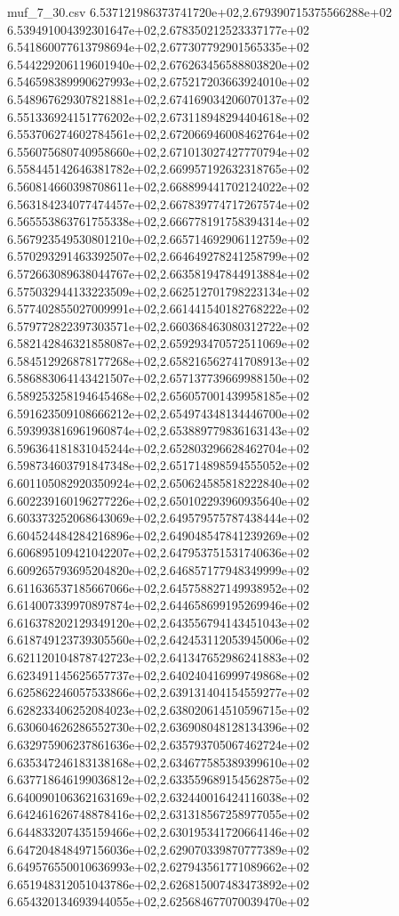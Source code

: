 \begin{filecontents*}{muf_7_30.csv}
6.537121986373741720e+02,2.679390715375566288e+02
6.539491004392301647e+02,2.678350212523337177e+02
6.541860077613798694e+02,2.677307792901565335e+02
6.544229206119601940e+02,2.676263456588803820e+02
6.546598389990627993e+02,2.675217203663924010e+02
6.548967629307821881e+02,2.674169034206070137e+02
6.551336924151776202e+02,2.673118948294404618e+02
6.553706274602784561e+02,2.672066946008462764e+02
6.556075680740958660e+02,2.671013027427770794e+02
6.558445142646381782e+02,2.669957192632318765e+02
6.560814660398708611e+02,2.668899441702124022e+02
6.563184234077474457e+02,2.667839774717267574e+02
6.565553863761755338e+02,2.666778191758394314e+02
6.567923549530801210e+02,2.665714692906112759e+02
6.570293291463392507e+02,2.664649278241258799e+02
6.572663089638044767e+02,2.663581947844913884e+02
6.575032944133223509e+02,2.662512701798223134e+02
6.577402855027009991e+02,2.661441540182768222e+02
6.579772822397303571e+02,2.660368463080312722e+02
6.582142846321858087e+02,2.659293470572511069e+02
6.584512926878177268e+02,2.658216562741708913e+02
6.586883064143421507e+02,2.657137739669988150e+02
6.589253258194645468e+02,2.656057001439958185e+02
6.591623509108666212e+02,2.654974348134446700e+02
6.593993816961960874e+02,2.653889779836163143e+02
6.596364181831045244e+02,2.652803296628462704e+02
6.598734603791847348e+02,2.651714898594555052e+02
6.601105082920350924e+02,2.650624585818222840e+02
6.602239160196277226e+02,2.650102293960935640e+02
6.603373252068643069e+02,2.649579575787438444e+02
6.604524484284216896e+02,2.649048547841239269e+02
6.606895109421042207e+02,2.647953751531740636e+02
6.609265793695204820e+02,2.646857177948349999e+02
6.611636537185667066e+02,2.645758827149938952e+02
6.614007339970897874e+02,2.644658699195269946e+02
6.616378202129349120e+02,2.643556794143451043e+02
6.618749123739305560e+02,2.642453112053945006e+02
6.621120104878742723e+02,2.641347652986241883e+02
6.623491145625657737e+02,2.640240416999749868e+02
6.625862246057533866e+02,2.639131404154559277e+02
6.628233406252084023e+02,2.638020614510596715e+02
6.630604626286552730e+02,2.636908048128134396e+02
6.632975906237861636e+02,2.635793705067462724e+02
6.635347246183138168e+02,2.634677585389399610e+02
6.637718646199036812e+02,2.633559689154562875e+02
6.640090106362163169e+02,2.632440016424116038e+02
6.642461626748878416e+02,2.631318567258977055e+02
6.644833207435159466e+02,2.630195341720664146e+02
6.647204848497156036e+02,2.629070339870777389e+02
6.649576550010636993e+02,2.627943561771089662e+02
6.651948312051043786e+02,2.626815007483473892e+02
6.654320134693944055e+02,2.625684677070039470e+02

\end{filecontents*}
